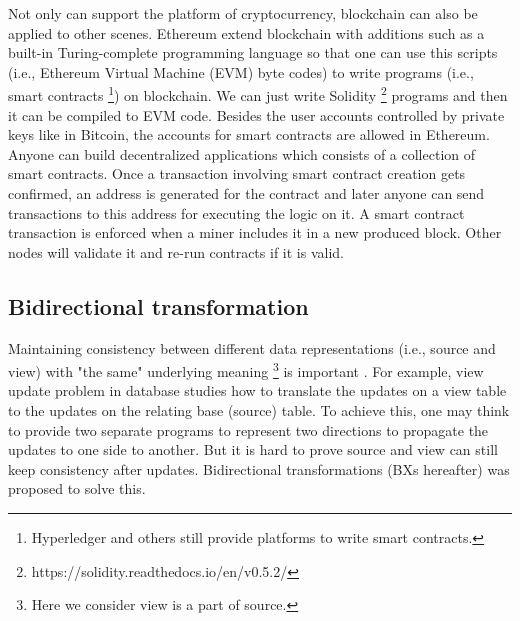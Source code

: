 \documentclass[conference]{IEEEtran}
\begin{document}
	Not only can support the platform of cryptocurrency, blockchain can also be applied to other scenes. Ethereum \cite{wood2014ethereum} extend blockchain with additions such as a built-in Turing-complete programming language so that one can use this scripts (i.e., Ethereum Virtual Machine (EVM) byte codes) to write programs (i.e., smart contracts \footnote{Hyperledger and others still provide platforms to write smart contracts.}) on blockchain. We can just write Solidity \footnote{https://solidity.readthedocs.io/en/v0.5.2/} programs and then it can be compiled to EVM code. Besides the user accounts controlled by private keys like in Bitcoin, the accounts for smart contracts are allowed in Ethereum. Anyone can build decentralized applications which consists of a collection of smart contracts. Once a transaction involving smart contract creation gets confirmed, an address is generated for the contract and later anyone can send transactions to this address for executing the logic on it. A smart contract transaction is enforced when a miner includes it in a new produced block. Other nodes will validate it and re-run contracts if it is valid.
	
	\subsection{Bidirectional transformation}
	Maintaining consistency between different data representations (i.e., source and view) with "the same" underlying meaning \footnote{Here we consider view is a part of source.}  is important \cite{abou2018introduction}. For example, view update problem in database \cite{bancilhon1981update} studies how to translate the updates on a view table to the updates on the relating base (source) table. To achieve this, one may think to provide two separate programs to represent two directions to propagate the updates to one side to another. But it is hard to prove source and view can still keep consistency after updates. Bidirectional transformations (BXs hereafter) was proposed  \cite{czarnecki2009bidirectional} to solve this.
	
\end{document}
